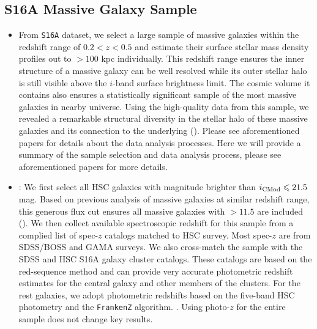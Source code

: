\documentclass[a4paper,fleqn,usenatbib]{mnras}
\begin{document}

\subsection{S16A Massive Galaxy Sample}
    \label{sec:sample}

	\begin{itemize}

		\item From \texttt{S16A} dataset, we select a large sample of massive galaxies
			within the redshift range of $0.2 < z < 0.5$ and estimate their surface
			stellar mass density profiles out to $>100$ kpc individually.
			This redshift range ensures the inner structure of a massive galaxy can be
			well resolved while its outer stellar halo is still visible above the $i$-band
			surface brightness limit.
			The cosmic volume it contains also ensures a statistically significant sample
			of the most massive galaxies in nearby universe.
			Using the high-quality data from this sample, we revealed a remarkable structural
			diversity in the stellar halo of these massive galaxies and its connection to
			the underlying \mhalo{} (\addref{}).
			Please see aforementioned papers for details about the data analysis processes.
			Here we will provide a summary of the sample selection and data analysis
			process, please see aforementioned papers for more details.

		\item {}: We first select all HSC galaxies with \cmodel{} magnitude
			brighter than $i_{\rm CMod} \leq 21.5$ mag. Based on previous analysis of massive
			galaxies at similar redshift range, this generous flux cut ensures all massive
			galaxies with \mstar{}$>11.5$ are included (\addref{}).
			We then collect available spectroscopic redshift for this sample from a complied
			list of spec-$z$ catalogs matched to HSC survey.
			Most spec-$z$ are from SDSS/BOSS and GAMA surveys.
			We also cross-match the sample with the SDSS \redm{} and HSC S16A \camira{}
			galaxy cluster catalogs.
			These catalogs are based on the red-sequence method and can provide very accurate
			photometric redshift estimates for the central galaxy and other members of the
			clusters.
			For the rest galaxies, we adopt photometric redshifts based on the five-band
			HSC \cmodel{} photometry and the \texttt{FrankenZ} algorithm. . Using photo-$z$ for the entire sample
			does not change key results.


\end{itemize}
\end{document}
